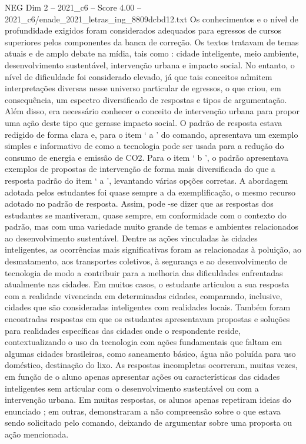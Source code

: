 \begin{textsample}{NEG Dim 2 – 2021\_c6 – Score 4.00 – 2021\_c6/enade\_2021\_letras\_ing\_8809dcbd12.txt}
Os conhecimentos e o nível de profundidade exigidos foram considerados adequados para egressos de cursos superiores pelos componentes da banca de correção.
Os textos tratavam de temas atuais e de amplo debate na mídia, tais como : cidade inteligente, meio ambiente, desenvolvimento sustentável, intervenção urbana e impacto social.
No entanto, o nível de dificuldade foi considerado elevado, já que tais conceitos admitem interpretações diversas nesse universo particular de egressos, o que criou, em consequência, um espectro diversificado de respostas e tipos de argumentação.
Além disso, era necessário conhecer o conceito de intervenção urbana para propor uma ação deste tipo que gerasse impacto social.
O padrão de resposta estava redigido de forma clara e, para o item ‘ a ’ do comando, apresentava um exemplo simples e informativo de como a tecnologia pode ser usada para a redução do consumo de energia e emissão de CO2.
Para o item ‘ b ’, o padrão apresentava exemplos de propostas de intervenção de forma mais diversificada do que a resposta padrão do item ‘ a ’, levantando várias opções corretas.
A abordagem adotada pelos estudantes foi quase sempre a da exemplificação, o mesmo recurso adotado no padrão de resposta.
Assim, pode -se dizer que as respostas dos estudantes se mantiveram, quase sempre, em conformidade com o contexto do padrão, mas com uma variedade muito grande de temas e ambientes relacionados ao desenvolvimento sustentável.
Dentre as ações vinculadas às cidades inteligentes, as ocorrências mais significativas foram as relacionadas à poluição, ao desmatamento, aos transportes coletivos, à segurança e ao desenvolvimento de tecnologia de modo a contribuir para a melhoria das dificuldades enfrentadas atualmente nas cidades.
Em muitos casos, o estudante articulou a sua resposta com a realidade vivenciada em determinadas cidades, comparando, inclusive, cidades que são consideradas inteligentes com realidades locais.
Também foram encontradas respostas em que os estudantes apresentavam propostas e soluções para realidades específicas das cidades onde o respondente reside, contextualizando o uso da tecnologia com ações fundamentais que faltam em algumas cidades brasileiras, como saneamento básico, água não poluída para uso doméstico, destinação do lixo.
As respostas incompletas ocorreram, muitas vezes, em função de o aluno apenas apresentar ações ou características das cidades inteligentes sem articular com o desenvolvimento sustentável ou com a intervenção urbana.
Em muitas respostas, os alunos apenas repetiram ideias do enunciado ; em outras, demonstraram a não compreensão sobre o que estava sendo solicitado pelo comando, deixando de argumentar sobre uma proposta ou ação mencionada.

\end{textsample}
